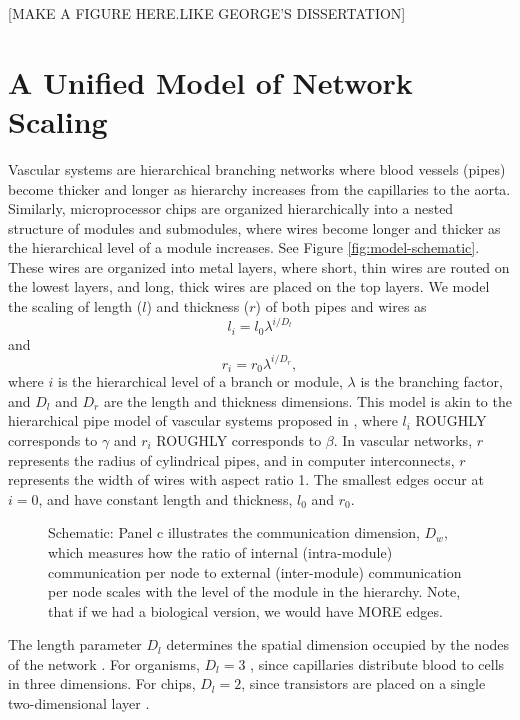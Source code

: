 \documentclass[12pt]{article}
\begin{document}
[MAKE A FIGURE HERE.LIKE GEORGE'S DISSERTATION]

\section{A Unified Model of Network Scaling}
\label{sec:unified-model}


Vascular systems are hierarchical branching networks where blood 
vessels (pipes) become thicker and longer as hierarchy increases from 
the capillaries to the aorta. Similarly, microprocessor chips are 
organized hierarchically into a nested structure of modules and 
submodules, where wires become longer and thicker as the hierarchical 
level of a module increases.  See Figure \ref{fig:model-schematic}.  These wires are organized into metal 
layers, where short, thin wires are routed on the lowest layers, and 
long, thick wires are placed on the top layers. We model the scaling 
of length ($l$) and thickness ($r$) of both pipes and wires as
\begin{equation}
l_i = l_0 \lambda^{i/D_l}
\end{equation}
and
\begin{equation}
r_i = r_0 \lambda^{i/D_r},
\end{equation}
where $i$ is the hierarchical level of a branch or module, $\lambda$ 
is the branching factor, and $D_l$ and $D_r$ are the length and 
thickness dimensions.  This model is akin to the hierarchical pipe 
model of vascular systems proposed in \cite{west97}, where $l_i$ 
ROUGHLY corresponds to $\gamma$ and $r_i$ ROUGHLY corresponds to $\beta$.  In vascular 
networks, $r$ represents the radius of cylindrical pipes, and in 
computer interconnects, $r$ represents the width of wires with aspect 
ratio 1.  The smallest edges occur at $i = 0$, and have constant 
length and thickness, $l_0$ and $r_0$. 

\begin{figure}
\caption{Schematic: Panel c illustrates the communication dimension, $D_w$,
  which measures how the ratio of internal (intra-module) communication per node to
  external (inter-module) communication per node scales with the level of the module in
  the hierarchy. Note, that if we had a biological version, we would
  have MORE edges.}
\end{figure}

The length parameter $D_l$ determines the spatial dimension occupied 
by the nodes of the network \cite{mandelbrot83}.
For organisms, $D_l = 3$ 
\cite{west97}, since capillaries distribute blood to cells in three 
dimensions.  For chips, $D_l = 2$, since transistors are placed on a 
single two-dimensional layer \cite{donath81}.
\end{document}
